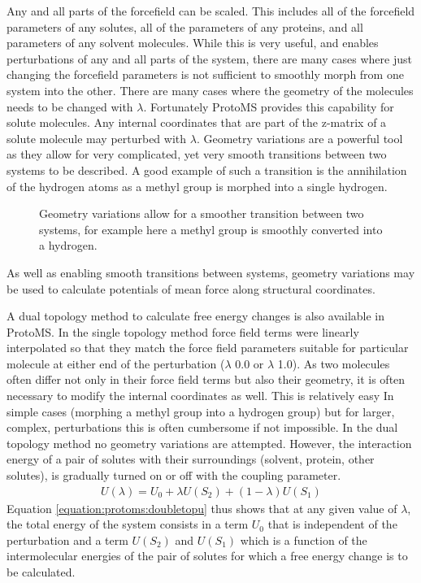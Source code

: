 \documentclass[letterpaper,10pt,english]{sphinxmanual}
\begin{document}
Any and all parts of the forcefield can be scaled. This includes all of the forcefield parameters of any solutes, all of the parameters of any proteins, and all parameters of any solvent molecules. While this is very useful, and enables perturbations of any and all parts of the system, there are many cases where just changing the forcefield parameters is not sufficient to smoothly morph from one system into the other. There are many cases where the geometry of the molecules needs to be changed with \(\lambda\). Fortunately ProtoMS provides this capability for solute molecules. Any internal coordinates that are part of the z-matrix of a solute molecule may perturbed with \(\lambda\). Geometry variations are a powerful tool as they allow for very complicated, yet very smooth transitions between two systems to be described. A good example of such a transition is the annihilation of the hydrogen atoms as a methyl group is morphed into a single hydrogen.

\begin{figure}[htbp]
\centering
\capstart

\noindent{}
\caption{Geometry variations allow for a smoother transition between two systems, for example here a methyl group is smoothly converted into a hydrogen.}\label{\detokenize{protoms:id4}}\end{figure}

As well as enabling smooth transitions between systems, geometry variations may be used to calculate potentials of mean force along structural coordinates.

\ignorespaces 
{}

A dual topology method to calculate free energy changes is also available in ProtoMS. In the single topology method force field terms were linearly interpolated so that they match the force field parameters suitable for particular molecule at either end of the perturbation (\(\lambda\) 0.0 or \(\lambda\) 1.0). As two molecules often differ not only in their force field terms but also their geometry, it is often necessary to modify the internal coordinates as well. This is relatively easy In simple cases (morphing a methyl group into a hydrogen group) but for larger, complex, perturbations this is often cumbersome if not impossible. In the dual topology method no geometry variations are attempted. However, the interaction energy of a pair of solutes with their surroundings (solvent, protein, other solutes), is gradually turned on or off with the coupling parameter.
\begin{equation}\label{equation:protoms:doubletopu}
\begin{split}U(\lambda) = U_{0} + \lambda U(S_{2}) + (1 - \lambda) U(S_{1})\end{split}
\end{equation}
Equation \eqref{equation:protoms:doubletopu} thus shows that at any given value of \(\lambda\), the total energy of the system consists in a term \(U_{0}\) that is independent of the perturbation and a term \(U(S_{2})\) and \(U(S_{1})\) which is a function of the intermolecular energies of the pair of solutes for which a free energy change is to be calculated.
\end{document}
